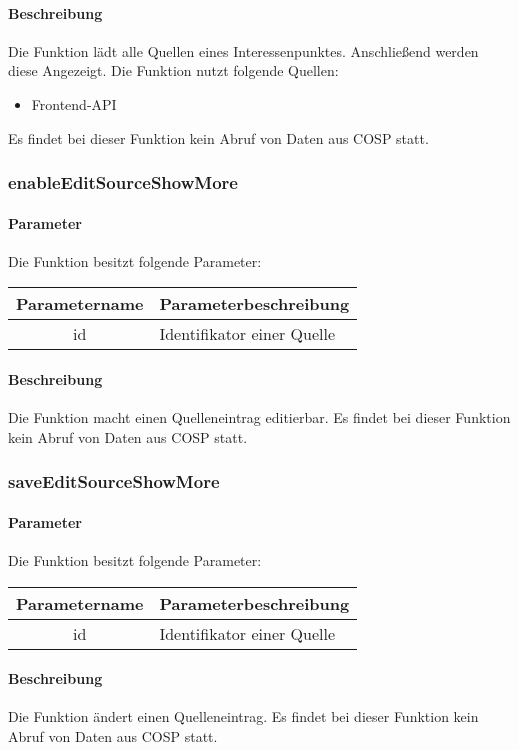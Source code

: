 \paragraph{Beschreibung} Die Funktion lädt alle Quellen eines Interessenpunktes. Anschließend werden diese Angezeigt. Die Funktion nutzt folgende Quellen:
\begin{itemize}
	\item Frontend-API
\end{itemize}
Es findet bei dieser Funktion kein Abruf von Daten aus {\glqq COSP\grqq} statt.
\subsubsection{enableEditSourceShowMore}
\paragraph{Parameter} Die Funktion besitzt folgende Parameter:
\begin{table}[H]
	\begin{tabular}{|c|p{11cm}|}
		\hline
		\textbf{Parametername} & \textbf{Parameterbeschreibung} \\ \hline
		id & Identifikator einer Quelle \\ \hline
	\end{tabular}
\end{table}
\paragraph{Beschreibung} Die Funktion macht einen Quelleneintrag editierbar. Es findet bei dieser Funktion kein Abruf von Daten aus {\glqq COSP\grqq} statt.
\subsubsection{saveEditSourceShowMore}
\paragraph{Parameter} Die Funktion besitzt folgende Parameter:
\begin{table}[H]
	\begin{tabular}{|c|p{11cm}|}
		\hline
		\textbf{Parametername} & \textbf{Parameterbeschreibung} \\ \hline
		id & Identifikator einer Quelle \\ \hline
	\end{tabular}
\end{table}
\paragraph{Beschreibung} Die Funktion ändert einen Quelleneintrag. Es findet bei dieser Funktion kein Abruf von Daten aus {\glqq COSP\grqq} statt.
